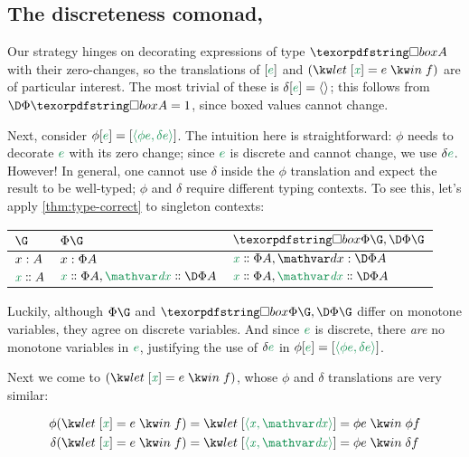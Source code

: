 
\subsection{The discreteness comonad, \iso}

Our strategy hinges on decorating expressions of type $\iso A$ with their
zero-changes, so the translations of $\ebox e$ and $(\eletbox x e f)$ are of
particular interest.
%
The most trivial of these is $\delta\ebox{e} = \etuple{}$; this follows from
$\DP\iso A = \tunit$, since boxed values cannot change.

Next, consider \(\phi\ebox e = \ebox{\etuple{\phi e, \delta e}}\).
%
The intuition here is straightforward: $\phi$ needs to decorate $\isocolor e$
with its zero change; since $\isocolor e$ is discrete and cannot change, we use
$\delta \isocolor e$.
%
However! In general, one cannot use $\delta$ inside the $\phi$ translation and
expect the result to be well-typed; $\phi$ and $\delta$ require different typing
contexts. To see this, let's apply \cref{thm:type-correct} to singleton
contexts:

\begin{center}
  \setlength\tabcolsep{10pt}
  \begin{tabular}{@{}lll@{}}
    $\G$ & $\Phi\G$ & $\iso\Phi\G,\DP\G$
    \\
    \midrule
    ${x} : {A}$ & ${x} : {\Phi A}$ & $\hd x {\Phi A}, \h\dx{\DP A}$
    \\
    $\hd x A$
    & $\hd x {\Phi A}, \hd\dx{\DP A}$
    & $\hd x {\Phi A}, \hd\dx{\DP A}$
  \end{tabular}
\end{center}

\noindent
Luckily, although $\Phi\G$ and $\iso\Phi\G,\DP\G$ differ on monotone variables,
they agree on discrete variables. And since $\isocolor e$ is discrete, there
\emph{are} no monotone variables in $\isocolor e$, justifying the use of
$\delta\isocolor e$ in $\phi\ebox{e} = \ebox{\etuple{\phi e, \delta e}}$.

Next we come to $(\eletbox x e f)$, whose $\phi$ and $\delta$ translations are
very similar:

\begin{align*}
  \phi(\eletbox x e f)
  &=
  \elet{\ebox{\etuple{\dvar x,\dvar\dx}} = \phi e} \phi f
  \\
  \delta(\eletbox x e f) &=
  \elet{\ebox{\etuple{\dvar x,\dvar\dx}} = \phi e} \delta f
\end{align*}

